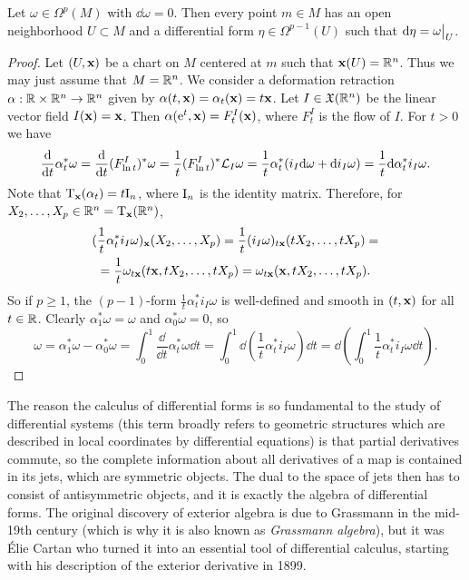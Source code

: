 \begin{thm}\label{lem poincare classic}
    Let $\omega\in\Omega^p(M)$ with $\dd\omega=0$. Then every point $m\in M$ has an open neighborhood $U\subset M$ and a differential form $\eta\in\Omega^{p-1}(U)$ such that $\dd\eta=\restr{\omega}{U}$.
\end{thm}
\begin{proof}
    Let $(U,\bf{x})$ be a chart on $M$ centered at $m$ such that $\bf{x}(U)=\bbR^n$. Thus we may just assume that $M=\bbR^n$. We consider a deformation retraction $\alpha:\bbR\times\bbR^n\to \bbR^n$ given by $\alpha(t,\bf{x})=\alpha_t(\bf{x})=t\bf{x}$. Let $I\in \fX(\bbR^n)$ be the linear vector field $I(\bf{x})=\bf{x}$. Then $\alpha(\rme^t,\bf{x})=F^I_t(\bf{x})$, where $F^I_t$ is the flow of $I$. For $t>0$ we have 
    \[\frac{\dd}{\dd t}\alpha_t^\ast\omega=\frac{\dd}{\dd t}(F^I_{\ln t})^\ast\omega=\frac{1}{t}(F^I_{\ln t})^\ast \Lie_{I}\omega=\frac{1}{t}\alpha_t^\ast(i_{I}\dd\omega+\dd i_{I}\omega)=\frac{1}{t}\dd\alpha_t^\ast i_{I}\omega.\]
    Note that $\T_{\bf{x}}(\alpha_t)=t\rmI_n$, where $\rmI_n$ is the identity matrix. Therefore, for $X_2,\ldots,X_p\in \bbR^n=\T_{\bf{x}}(\bbR^n)$,
    \begin{multline}
        (\frac{1}{t}\alpha_t^\ast i_{I}\omega)_{\bf{x}}(X_2,\ldots,X_p)=\frac{1}{t}(i_I\omega)_{t\bf{x}}(tX_2,\ldots,tX_p)=\\
        =\frac{1}{t}\omega_{t\bf{x}}(t\bf{x},tX_2,\ldots,tX_p)=\omega_{t\bf{x}}(\bf{x},tX_2,\ldots,tX_p).
    \end{multline}
    So if $p\geq 1$, the $(p-1)$-form $\frac{1}{t}\alpha^\ast_t i_I\omega$ is well-defined and smooth in $(t,\bf{x})$ for all $t\in\bbR$. Clearly $\alpha^\ast_1\omega=\omega$ and $\alpha^\ast_0\omega=0$, so 
    \[\omega=\alpha_1^\ast\omega-\alpha^\ast_0\omega=\int_0^1\frac{\dd}{\dd t}\alpha_t^\ast\omega\dd t=\int_0^1\dd \left(\frac{1}{t}\alpha_t^\ast i_I\omega\right)\dd t=\dd \left(\int_0^1\frac{1}{t}\alpha_t^\ast i_I\omega\dd t\right).\]
\end{proof}

\begin{rem}
    The reason the calculus of differential forms is so fundamental to the study of differential systems (this term broadly refers to geometric structures which are described in local coordinates by differential equations) is that partial derivatives commute, so the complete information about all derivatives of a map is contained in its jets, which are symmetric objects. The dual to the space of jets then has to consist of antisymmetric objects, and it is exactly the algebra of differential forms. The original discovery of exterior algebra is due to Grassmann in the mid-19th century (which is why it is also known as \emph{Grassmann algebra}), but it was \'Elie Cartan who turned it into an essential tool of differential calculus, starting with his description of the exterior derivative in 1899.
\end{rem}


